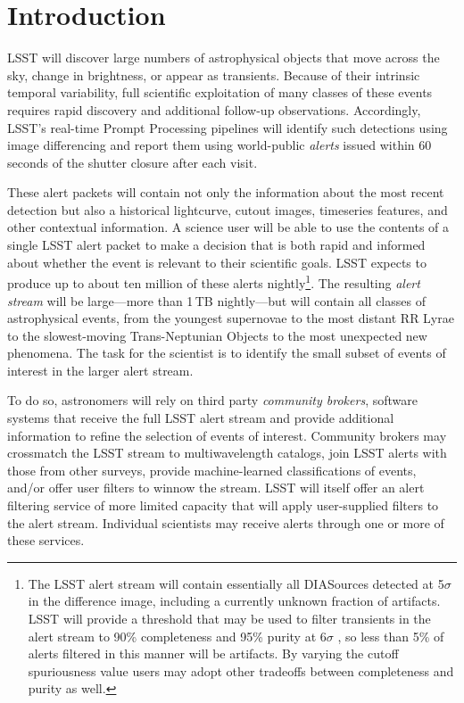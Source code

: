 \section{Introduction}\label{sec:introduction}

LSST \citep{2019ApJ...873..111I} will discover large numbers of astrophysical objects that move across the sky, change in brightness, or appear as transients.
Because of their intrinsic temporal variability, full scientific exploitation of many classes of these events requires rapid discovery and additional follow-up observations.
Accordingly, LSST's real-time Prompt Processing pipelines  will identify such detections using image differencing and report them using world-public \textit{alerts} issued within 60 seconds of the shutter closure after each visit.

These alert packets will contain not only the information about the most recent detection but also a historical lightcurve, cutout images, timeseries features, and other contextual information.
A science user will be able to use the contents of a single LSST alert packet to make a decision that is both rapid and informed about whether the event is relevant to their scientific goals.
LSST expects to produce up to about ten million of these alerts nightly\footnote{The LSST alert stream will contain essentially all DIASources detected at 5$\sigma$ in the difference image, including a currently unknown fraction of artifacts.
LSST will provide a threshold that may be used to filter transients in the alert stream to 90\% completeness and 95\% purity at 6$\sigma$ , so less than 5\% of alerts filtered in this manner will be artifacts.
By varying the cutoff spuriousness value users may adopt other tradeoffs between completeness and purity as well.}.
The resulting \textit{alert stream} will be large---more than 1\,TB nightly---but will contain all classes of astrophysical events, from the youngest supernovae to the most distant RR Lyrae to the slowest-moving Trans-Neptunian Objects to the most unexpected new phenomena.
The task for the scientist is to identify the small subset of events of interest in the larger alert stream.

To do so, astronomers will rely on third party \textit{community brokers}, software systems that receive the full LSST alert stream and provide additional information to refine the selection of events of interest.
Community brokers may crossmatch the LSST stream to multiwavelength catalogs, join LSST alerts with those from other surveys, provide machine-learned classifications of events, and/or offer user filters to winnow the stream.
LSST will itself offer an alert filtering service of more limited capacity that will apply user-supplied filters to the alert stream.
Individual scientists may receive alerts through one or more of these services.

